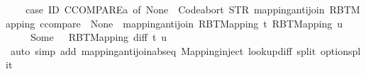 \begin{isabellebody}
\ \ \ \ {\isacharparenleft}{\kern0pt}case\ ID\ CCOMPARE{\isacharparenleft}{\kern0pt}{\isacharprime}{\kern0pt}a{\isacharparenright}{\kern0pt}\ of\ None\ {\isasymRightarrow}\ Code{\isachardot}{\kern0pt}abort\ {\isacharparenleft}{\kern0pt}STR\ {\isacharprime}{\kern0pt}{\isacharprime}{\kern0pt}mapping{\isacharunderscore}{\kern0pt}antijoin\ RBT{\isacharunderscore}{\kern0pt}Mapping{\isacharcolon}{\kern0pt}\ ccompare\ {\isacharequal}{\kern0pt}\ None{\isacharprime}{\kern0pt}{\isacharprime}{\kern0pt}{\isacharparenright}{\kern0pt}\ {\isacharparenleft}{\kern0pt}{\isasymlambda}{\isacharunderscore}{\kern0pt}{\isachardot}{\kern0pt}\ mapping{\isacharunderscore}{\kern0pt}antijoin\ {\isacharparenleft}{\kern0pt}RBT{\isacharunderscore}{\kern0pt}Mapping\ t{\isacharparenright}{\kern0pt}\ {\isacharparenleft}{\kern0pt}RBT{\isacharunderscore}{\kern0pt}Mapping\ u{\isacharparenright}{\kern0pt}{\isacharparenright}{\kern0pt}\isanewline
\ \ \ \ {\isacharbar}{\kern0pt}\ Some\ {\isacharunderscore}{\kern0pt}\ {\isasymRightarrow}\ RBT{\isacharunderscore}{\kern0pt}Mapping\ {\isacharparenleft}{\kern0pt}diff\ t\ u{\isacharparenright}{\kern0pt}{\isacharparenright}{\kern0pt}{\isachardoublequoteclose}\isanewline
%
\isadelimproof
\ \ %
\endisadelimproof
%
\isatagproof
{}\isamarkupfalse%
\ {\isacharparenleft}{\kern0pt}auto\ simp\ add{\isacharcolon}{\kern0pt}\ mapping{\isacharunderscore}{\kern0pt}antijoin{\isachardot}{\kern0pt}abs{\isacharunderscore}{\kern0pt}eq\ Mapping{\isacharunderscore}{\kern0pt}inject\ lookup{\isacharunderscore}{\kern0pt}diff\ split{\isacharcolon}{\kern0pt}\ option{\isachardot}{\kern0pt}split{\isacharparenright}{\kern0pt}%
\endisatagproof
{\isafoldproof}%
%
\isadelimproof
\isanewline
%
\endisadelimproof
%
\isadelimtheory
\isanewline
%
\endisadelimtheory
%
\isatagtheory
{}\isamarkupfalse%
%
\endisatagtheory
{\isafoldtheory}%
%
\isadelimtheory
%
\endisadelimtheory
%
\end{isabellebody}%
\endinput
